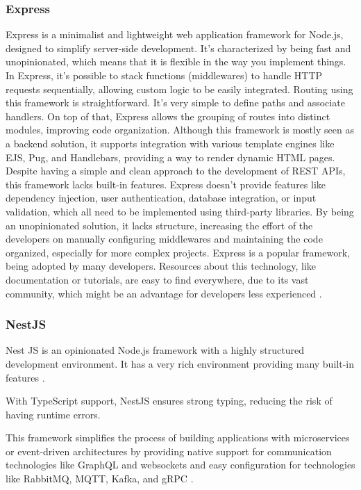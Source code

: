 \subsubsection{Express}
Express is a minimalist and lightweight web application framework for Node.js,
designed to simplify server-side development. It's characterized by being
fast and unopinionated, which means that it is flexible in the way you implement
things.
In Express, it's possible to stack functions (middlewares) to handle \gls{HTTP}
requests sequentially, allowing custom logic to be easily integrated.
Routing using this framework is straightforward. It's very simple to define
paths and associate handlers. On top of that, Express allows the grouping of
routes into distinct modules, improving code organization.
Although this framework is mostly seen as a backend solution, it supports
integration with various template engines like \gls{EJS}, Pug, and Handlebars,
providing a way to render dynamic \gls{HTML} pages.
Despite having a simple and clean approach to the development of \gls{REST} \gls{API}s,
this framework lacks built-in features. Express doesn't provide features like
dependency injection, user authentication, database integration, or input
validation, which all need to be implemented using third-party libraries.
By being an unopinionated solution, it lacks structure, increasing the effort
of the developers on manually configuring middlewares and maintaining the code
organized, especially for more complex projects.
Express is a popular framework, being adopted by many developers. Resources
about this technology, like documentation or tutorials, are easy to find
everywhere, due to its vast community, which might be an advantage for
developers less experienced \cite{expressJSMDN}.

\subsubsection{NestJS}
Nest JS is an opinionated Node.js framework with a highly structured
development environment. It has a very rich environment providing many built-in
features \cite{nestJS}.

With TypeScript support, NestJS ensures strong typing, reducing the risk of
having runtime errors.

This framework simplifies the process of building applications with
microservices or event-driven architectures by providing native support for
communication technologies like GraphQL and websockets and easy configuration
for technologies like RabbitMQ, \gls{MQTT}, Kafka, and \gls{gRPC} \cite{nestJS}.

